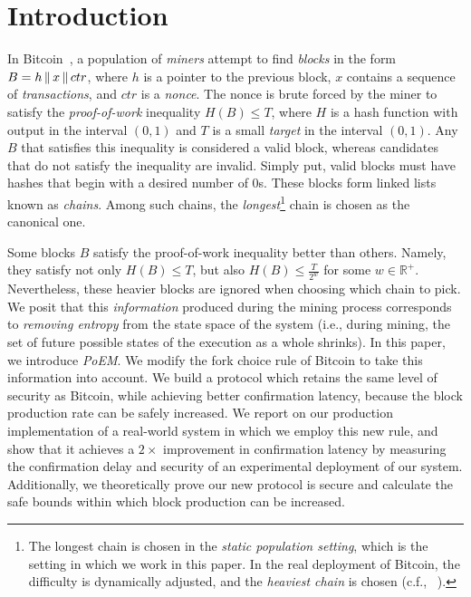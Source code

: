 \section{Introduction}

In Bitcoin~\cite{bitcoin}, a population of \emph{miners}
attempt to find \emph{blocks} in the form $B = h \,\|\, x \,\|\, ctr$,
where $h$ is a pointer to the previous block, $x$ contains a sequence of
\emph{transactions}, and $ctr$ is a \emph{nonce}. The nonce is brute forced
by the miner to satisfy the \emph{proof-of-work} inequality $H(B) \leq T$, where
$H$ is a hash function with output in the interval $(0, 1)$
and $T$ is a small \emph{target} in the interval $(0, 1)$. Any $B$ that satisfies this
inequality is considered a valid block, whereas candidates that do not satisfy
the inequality are invalid. Simply put, valid blocks must have
hashes that begin with a desired number of $0$s.
These blocks form linked lists known as \emph{chains}.
Among such chains, the \emph{longest}\footnote{The
longest chain is chosen in the \emph{static population setting}, which is the
setting in which we work in this paper. In the real deployment of Bitcoin, the
difficulty is dynamically adjusted, and the \emph{heaviest chain} is chosen (c.f.,
~\cite{varbackbone}).} chain is chosen as the canonical one.

Some blocks $B$ satisfy the proof-of-work inequality better than others.
Namely, they satisfy not only $H(B) \leq T$, but also $H(B) \leq \frac{T}{2^w}$
for some $w \in \mathbb{R}^+$. Nevertheless, these heavier blocks are ignored when choosing
which chain to pick. We posit that this \emph{information}
produced during the mining process corresponds to \emph{removing entropy} from the
state space of the system (i.e., during mining, the set of future possible states
of the execution as a whole shrinks).
In this paper, we introduce \emph{PoEM}.
We modify the fork choice rule of Bitcoin to take this information into account.
We build a protocol which retains the same level of security as Bitcoin, while achieving
better confirmation latency, because the block production rate can be safely increased.
We report on our production implementation of a real-world system
in which we employ this new rule, and show that it achieves a $2\times$ 
improvement in confirmation latency by measuring the confirmation delay and security
of an experimental deployment of our system.
Additionally, we theoretically prove our new protocol is secure and calculate the safe
bounds within which block production can be increased.

